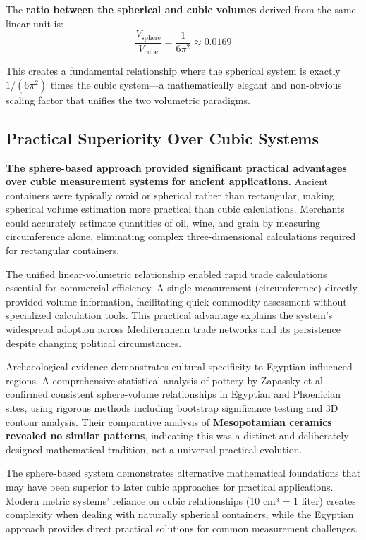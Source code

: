 \documentclass[11pt]{article}
\begin{document}
The \textbf{ratio between the spherical and cubic volumes} derived from the same linear unit is:
\[ \frac{V_{\text{sphere}}}{V_{\text{cube}}} = \frac{1}{6\pi^2} \approx 0.0169 \]

This creates a fundamental relationship where the spherical system is exactly \textbf{$1/(6\pi^2)$} times the cubic system---a mathematically elegant and non-obvious scaling factor that unifies the two volumetric paradigms.

\subsection{Practical Superiority Over Cubic Systems}

\textbf{The sphere-based approach provided significant practical advantages over cubic measurement systems for ancient applications.} Ancient containers were typically ovoid or spherical rather than rectangular, making spherical volume estimation more practical than cubic calculations. Merchants could accurately estimate quantities of oil, wine, and grain by measuring circumference alone, eliminating complex three-dimensional calculations required for rectangular containers.

The unified linear-volumetric relationship enabled rapid trade calculations essential for commercial efficiency. A single measurement (circumference) directly provided volume information, facilitating quick commodity assessment without specialized calculation tools. This practical advantage explains the system's widespread adoption across Mediterranean trade networks and its persistence despite changing political circumstances.

Archaeological evidence demonstrates cultural specificity to Egyptian-influenced regions. A comprehensive statistical analysis of pottery by Zapassky et al. \cite{zapassky2012ancient} confirmed consistent sphere-volume relationships in Egyptian and Phoenician sites, using rigorous methods including bootstrap significance testing and 3D contour analysis. Their comparative analysis of \textbf{Mesopotamian ceramics revealed no similar patterns}, indicating this was a distinct and deliberately designed mathematical tradition, not a universal practical evolution.

The sphere-based system demonstrates alternative mathematical foundations that may have been superior to later cubic approaches for practical applications. Modern metric systems' reliance on cubic relationships (10 cm³ = 1 liter) creates complexity when dealing with naturally spherical containers, while the Egyptian approach provides direct practical solutions for common measurement challenges.
\end{document}
